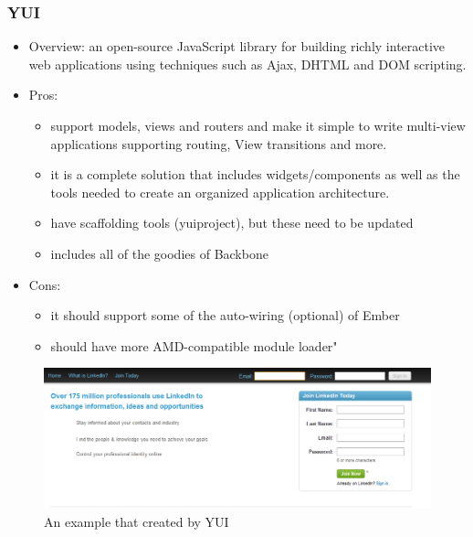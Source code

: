 \documentclass[14pt,a4paper]{extreport}
\begin{document}
		\subsubsection{YUI}
			\begin{itemize}
				\item Overview: an open-source JavaScript library for building richly interactive web applications using techniques such as Ajax, DHTML and DOM scripting.
				\item Pros: 
					\begin{itemize}
						\item support models, views and routers and make it simple to write multi-view applications supporting routing, View transitions and more.
						\item it is a complete solution that includes widgets/components as well as the tools needed to create an organized application architecture.
						\item have scaffolding tools (yuiproject), but these need to be updated
						\item includes all of the goodies of Backbone
					\end{itemize}
				\item Cons:
					\begin{itemize}
						\item it should support some of the auto-wiring (optional) of Ember
						\item should have more AMD-compatible module loader"
					
					\end{itemize}
			\end{itemize}
			\begin{figure}
				\begin{center}
				\includegraphics[scale=0.6]{YUI.png}
				\caption{An example that created by YUI}
				\end{center}			
			\end{figure}
\end{document}
